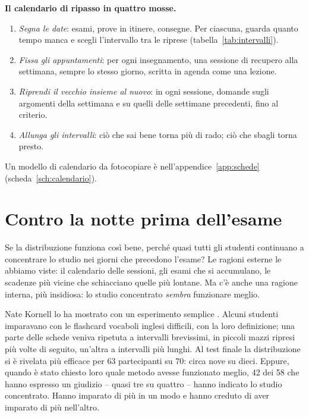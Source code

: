 \begin{inpratica}
\textbf{Il calendario di ripasso in quattro mosse.}
\begin{enumerate}
  \item \emph{Segna le date}: esami, prove in itinere, consegne. Per
        ciascuna, guarda quanto tempo manca e scegli l'intervallo tra
        le riprese (tabella~\ref{tab:intervalli}).
  \item \emph{Fissa gli appuntamenti}: per ogni insegnamento, una
        sessione di recupero alla settimana, sempre lo stesso giorno,
        scritta in agenda come una lezione.
  \item \emph{Riprendi il vecchio insieme al nuovo}: in ogni sessione,
        domande sugli argomenti della settimana e su quelli delle
        settimane precedenti, fino al criterio.
  \item \emph{Allunga gli intervalli}: ciò che sai bene torna più di
        rado; ciò che sbagli torna presto.
\end{enumerate}
Un modello di calendario da fotocopiare è nell'appendice~\ref{app:schede} (scheda~\ref{sch:calendario}).
\end{inpratica}

\section{Contro la notte prima dell'esame}

Se la distribuzione funziona così bene, perché quasi tutti gli
studenti continuano a concentrare lo studio nei giorni che precedono
l'esame? Le ragioni esterne le abbiamo viste: il calendario delle
sessioni, gli esami che si accumulano, le scadenze più vicine che
schiacciano quelle più lontane. Ma c'è anche una ragione interna, più
insidiosa: lo studio concentrato \emph{sembra} funzionare meglio.

Nate Kornell lo ha mostrato con un esperimento semplice
\parencite{kornell2009}. Alcuni studenti imparavano con le flashcard
vocaboli inglesi difficili, con la loro definizione; una parte delle
schede veniva ripetuta a intervalli brevissimi, in piccoli mazzi
ripresi più volte di seguito, un'altra a intervalli più lunghi. Al test finale la
distribuzione si è rivelata più efficace per 63 partecipanti su 70:
circa nove su dieci. Eppure, quando è stato chiesto loro quale metodo
avesse funzionato meglio, 42 dei 58 che hanno espresso un giudizio --
quasi tre su quattro -- hanno indicato lo studio concentrato. Hanno
imparato di più in un modo e hanno creduto di aver imparato di più
nell'altro.

